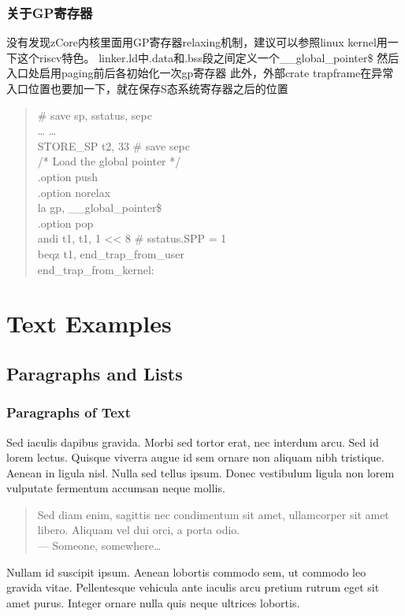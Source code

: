 \documentclass[
8pt, %
]{beamer}
\begin{document}
	\begin{frame}
		\frametitle{关于GP寄存器}
		没有发现zCore内核里面用GP寄存器relaxing机制，建议可以参照linux kernel用一下这个riscv特色。
		linker.ld中.data和.bss段之间定义一个\_\_global\_pointer\$
		然后入口处启用paging前后各初始化一次gp寄存器
		此外，外部crate trapframe在异常入口位置也要加一下，就在保存S态系统寄存器之后的位置
		\begin{quote}
			\# save sp, sstatus, sepc\\
			… …\\
			STORE\_SP t2, 33         \# save sepc\\
			\vspace {8pt} 
			/* Load the global pointer */\\
			.option push\\
			.option norelax\\
			la gp, \_\_global\_pointer\$\\
			.option pop\\
			\vspace {8pt} 
			andi t1, t1, 1 << 8     \# sstatus.SPP = 1\\
			beqz t1, end\_trap\_from\_user\\
			end\_trap\_from\_kernel:
		\end{quote}
	\end{frame}


	\section{Text Examples}

	\subsection{Paragraphs and Lists}

	\begin{frame}
	\frametitle{Paragraphs of Text}

	Sed iaculis \alert{dapibus gravida}. Morbi sed tortor erat, nec interdum arcu. Sed id lorem lectus. Quisque viverra augue id sem ornare non aliquam nibh tristique. Aenean in ligula nisl. Nulla sed tellus ipsum. Donec vestibulum ligula non lorem vulputate fermentum accumsan neque mollis.

	\bigskip %

	\begin{quote}
		Sed diam enim, sagittis nec condimentum sit amet, ullamcorper sit amet libero. Aliquam vel dui orci, a porta odio.\\
		--- Someone, somewhere\ldots
	\end{quote}

	\bigskip %

	Nullam id suscipit ipsum. Aenean lobortis commodo sem, ut commodo leo gravida vitae. Pellentesque vehicula ante iaculis arcu pretium rutrum eget sit amet purus. Integer ornare nulla quis neque ultrices lobortis.
	\end{frame}
\end{document}
